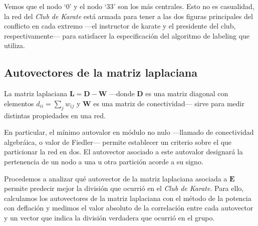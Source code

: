 \vspace{1em}
Vemos que el nodo `0' y el nodo `33' son los más centrales. Esto no es casualidad, la red del \textit{Club de Karate} está armada para tener a las dos figuras principales del conflicto en cada extremo ---el instructor de karate y el presidente del club, respectivamente--- para satisfacer la especificación del algoritmo de labeling que utiliza.





\vspace{2em}
\subsection{Autovectores de la matriz laplaciana} La matriz laplaciana $\mathbf{L} = \mathbf{D} - \mathbf{W}$ ---donde \textbf{D} es una matriz diagonal con elementos $d_{ii} = \sum_j w_{ij}$ y \textbf{W} es una matriz de conectividad--- sirve para medir distintas propiedades en una red. 

En particular, el mínimo autovalor en módulo no nulo ---llamado de conectividad algebráica, o valor de Fiedler--- permite establecer un criterio sobre el que particionar la red en dos. El autovector asociado a este autovalor designará la pertenencia de un nodo a una u otra partición acorde a su signo. 

\vspace{1em}
Procedemos a analizar qué autovector de la matriz laplaciana asociada a $\mathbf{E}$ permite predecir mejor la división que ocurrió en el \textit{Club de Karate}. Para ello, calculamos los autovectores de la matriz laplaciana con el método de la potencia con deflación y medimos el valor absoluto de la correlación entre cada autovector y un vector que indica la división verdadera que ocurrió en el grupo.

